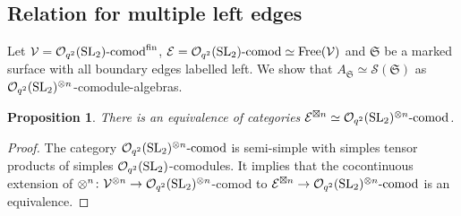 \documentclass[pdftex]{sigma}%
\numberwithin{equation}{section}
\newtheorem{Proposition}[Theorem]{Proposition}
 { \theoremstyle{definition}
\newtheorem{Definition}[Theorem]{Definition}
\newtheorem{Note}[Theorem]{Note}
\newtheorem{Example}[Theorem]{Example}
\newtheorem{Remark}[Theorem]{Remark} }
\newcommand{\Free}{\operatorname{Free}}
\newcommand{\Oq}{\mathcal{O}_{q^2}({\rm SL}_2)}
\begin{document}
\subsection{Relation for multiple left edges} Let $\mathcal{V} = \Oq\text{-}{\rm comod}^{\rm fin}$, $\mathcal{E} = \Oq\text{-}{\rm comod} \simeq \Free(\mathcal{V})$ and $\mathfrak{S}$ be a marked surface with all boundary edges labelled left. We show that $A_\mathfrak{S} \simeq \mathscr{S}(\mathfrak{S})$ as $\Oq^{\otimes n}$-comodule-algebras.
\begin{Proposition} There is an equivalence of categories $\mathcal{E}^{\boxtimes n}\simeq \Oq^{\otimes n}\text{-}{\rm comod}$.
\end{Proposition}
\begin{proof}
The category $\Oq^{\otimes n}\text{-}{\rm comod}$ is semi-simple with simples tensor products of simples $\Oq$-comodules. It implies that the cocontinuous extension of $\otimes^n\colon \mathcal{V}^{\otimes n}\to \Oq^{\otimes n}$-comod to $\mathcal{E}^{\boxtimes n}\to \Oq^{\otimes n}\text{-}{\rm comod}$ is an equivalence.
\end{proof}
\end{document}
